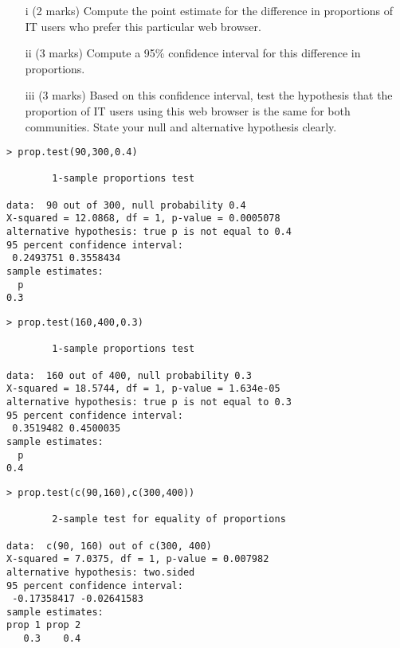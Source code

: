 \begin{itemize}
\begin{itemize}
\item[i] (2 marks) Compute the point estimate for the difference in proportions of IT users who prefer this particular web browser.
\item[ii] (3 marks) Compute a 95\% confidence interval for this difference in proportions.
\item[iii] (3 marks) Based on this confidence interval, test the hypothesis that the proportion of IT users using this web browser is the same for both communities. State your null and alternative hypothesis clearly.

\end{itemize}
\end{itemize}

\begin{framed}
\begin{verbatim}
> prop.test(90,300,0.4)

        1-sample proportions test

data:  90 out of 300, null probability 0.4
X-squared = 12.0868, df = 1, p-value = 0.0005078
alternative hypothesis: true p is not equal to 0.4
95 percent confidence interval:
 0.2493751 0.3558434
sample estimates:
  p
0.3
\end{verbatim}
\end{framed}
\begin{framed}
\begin{verbatim}
> prop.test(160,400,0.3)

        1-sample proportions test

data:  160 out of 400, null probability 0.3
X-squared = 18.5744, df = 1, p-value = 1.634e-05
alternative hypothesis: true p is not equal to 0.3
95 percent confidence interval:
 0.3519482 0.4500035
sample estimates:
  p
0.4
\end{verbatim}
\end{framed}
\newpage
\begin{framed}
\begin{verbatim}
> prop.test(c(90,160),c(300,400))

        2-sample test for equality of proportions

data:  c(90, 160) out of c(300, 400)
X-squared = 7.0375, df = 1, p-value = 0.007982
alternative hypothesis: two.sided
95 percent confidence interval:
 -0.17358417 -0.02641583
sample estimates:
prop 1 prop 2
   0.3    0.4

\end{verbatim}
\end{framed}

